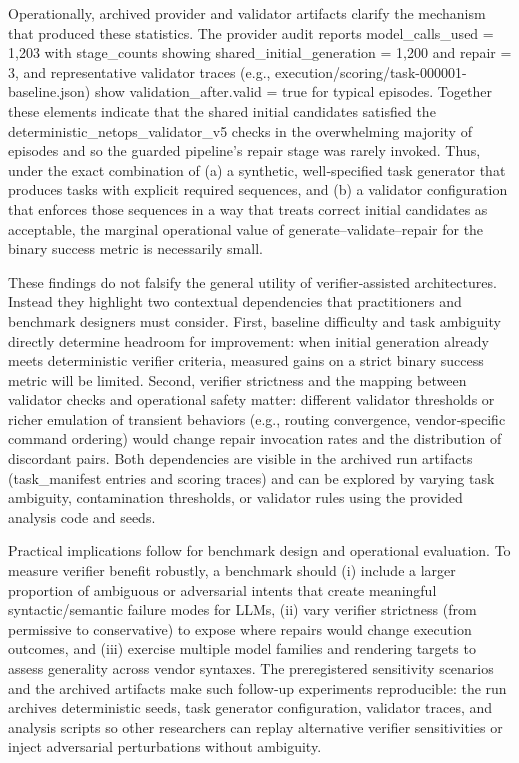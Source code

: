 \documentclass[conference]{IEEEtran}
\begin{document}
Operationally, archived provider and validator artifacts clarify the mechanism that produced these statistics. The provider audit reports model\_calls\_used = 1,203 with stage\_counts showing shared\_initial\_generation = 1,200 and repair = 3, and representative validator traces (e.g., execution/scoring/task-000001-baseline.json) show validation\_after.valid = true for typical episodes. Together these elements indicate that the shared initial candidates satisfied the deterministic\_netops\_validator\_v5 checks in the overwhelming majority of episodes and so the guarded pipeline's repair stage was rarely invoked. Thus, under the exact combination of (a) a synthetic, well‑specified task generator that produces tasks with explicit required sequences, and (b) a validator configuration that enforces those sequences in a way that treats correct initial candidates as acceptable, the marginal operational value of generate--validate--repair for the binary success metric is necessarily small.

These findings do not falsify the general utility of verifier‑assisted architectures. Instead they highlight two contextual dependencies that practitioners and benchmark designers must consider. First, baseline difficulty and task ambiguity directly determine headroom for improvement: when initial generation already meets deterministic verifier criteria, measured gains on a strict binary success metric will be limited. Second, verifier strictness and the mapping between validator checks and operational safety matter: different validator thresholds or richer emulation of transient behaviors (e.g., routing convergence, vendor‑specific command ordering) would change repair invocation rates and the distribution of discordant pairs. Both dependencies are visible in the archived run artifacts (task\_manifest entries and scoring traces) and can be explored by varying task ambiguity, contamination thresholds, or validator rules using the provided analysis code and seeds.

Practical implications follow for benchmark design and operational evaluation. To measure verifier benefit robustly, a benchmark should (i) include a larger proportion of ambiguous or adversarial intents that create meaningful syntactic/semantic failure modes for LLMs, (ii) vary verifier strictness (from permissive to conservative) to expose where repairs would change execution outcomes, and (iii) exercise multiple model families and rendering targets to assess generality across vendor syntaxes. The preregistered sensitivity scenarios and the archived artifacts make such follow‑up experiments reproducible: the run archives deterministic seeds, task generator configuration, validator traces, and analysis scripts so other researchers can replay alternative verifier sensitivities or inject adversarial perturbations without ambiguity.
\end{document}
